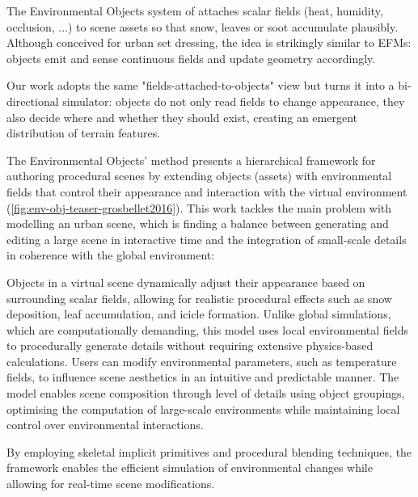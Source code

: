The Environmental Objects system of \citep{Grosbellet2016} attaches scalar fields (heat, humidity, occlusion, ...) to scene assets so that snow, leaves or soot accumulate plausibly. Although conceived for urban set dressing, the idea is strikingly similar to EFMs: objects emit and sense continuous fields and update geometry accordingly.

Our work adopts the same "fields-attached-to-objects" view but turns it into a bi-directional simulator: objects do not only read fields to change appearance, they also decide where and whether they should exist, creating an emergent distribution of terrain features.

The Environmental Objects' method presents a hierarchical framework for authoring procedural scenes by extending objects (assets) with environmental fields that control their appearance and interaction with the virtual environment (\cref{fig:env-obj-teaser-grosbellet2016}). This work tackles the main problem with modelling an urban scene, which is finding a balance between generating and editing a large scene in interactive time and the integration of small-scale details in coherence with the global environment:
\begin{Itemize}
\Item{} Objects in a virtual scene dynamically adjust their appearance based on surrounding scalar fields, allowing for realistic procedural effects such as snow deposition, leaf accumulation, and icicle formation. Unlike global simulations, which are computationally demanding, this model uses local environmental fields to procedurally generate details without requiring extensive physics-based calculations.
\Item{} Users can modify environmental parameters, such as temperature fields, to influence scene aesthetics in an intuitive and predictable manner. The model enables scene composition through level of details using object groupings, optimising the computation of large-scale environments while maintaining local control over environmental interactions.
\end{Itemize}
By employing skeletal implicit primitives and procedural blending techniques, the framework enables the efficient simulation of environmental changes while allowing for real-time scene modifications.

